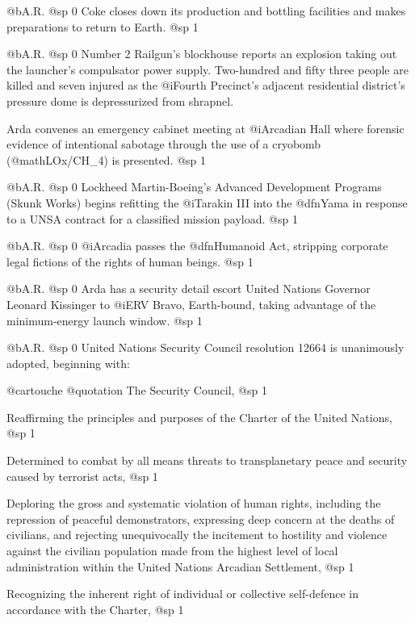@b{A.R.}
@sp 0
Coke closes down its production and bottling facilities and makes preparations to return to Earth.
@sp 1

@b{A.R.}
@sp 0
Number 2 Railgun's blockhouse reports an explosion taking out the launcher's compulsator power supply. Two-hundred and fifty three people are killed and seven injured as the @i{Fourth Precinct's} adjacent residential district's pressure dome is depressurized from shrapnel.

Arda convenes an emergency cabinet meeting at @i{Arcadian Hall} where forensic evidence of intentional sabotage through the use of a cryobomb (@math{LOx/CH_4}) is presented.
@sp 1

@b{A.R.}
@sp 0
Lockheed Martin-Boeing's Advanced Development Programs (Skunk Works) begins refitting the @i{Tarakin III} into the @dfn{Yama} in response to a UNSA contract for a classified mission payload.
@sp 1

@b{A.R.}
@sp 0
@i{Arcadia} passes the @dfn{Humanoid Act}, stripping corporate legal fictions of the rights of human beings.
@sp 1

@b{A.R.}
@sp 0
Arda has a security detail escort United Nations Governor Leonard Kissinger to @i{ERV Bravo}, Earth-bound, taking advantage of the minimum-energy launch window.
@sp 1

@b{A.R.}
@sp 0
United Nations Security Council resolution 12664 is unanimously adopted, beginning with:

@cartouche
@quotation
The Security Council,
@sp 1

Reaffirming the principles and purposes of the Charter of the United Nations,
@sp 1

Determined to combat by all means threats to transplanetary peace and security caused by terrorist acts,
@sp 1

Deploring the gross and systematic violation of human rights, including the repression of peaceful demonstrators, expressing deep concern at the deaths of civilians, and rejecting unequivocally the incitement to hostility and violence against the civilian population made from the highest level of local administration within the United Nations Arcadian Settlement,
@sp 1

Recognizing the inherent right of individual or collective self-defence in accordance with the Charter,
@sp 1

